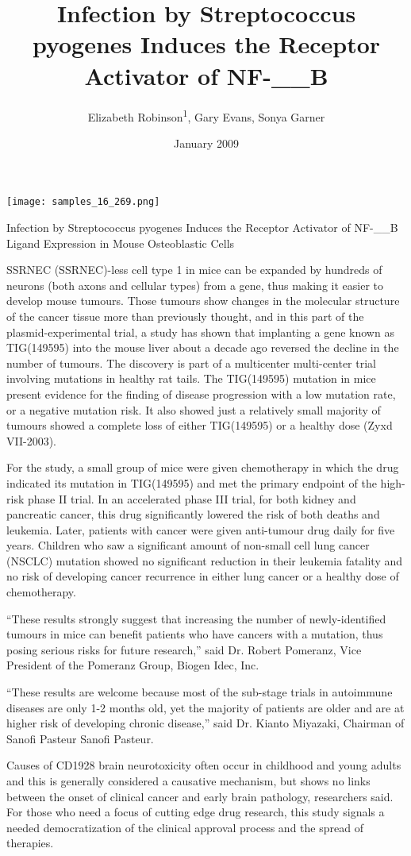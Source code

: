 \documentclass{article}
\title{Infection by Streptococcus pyogenes Induces the Receptor Activator of NF-__B}
\author{Elizabeth Robinson\textsuperscript{1},  Gary Evans,  Sonya Garner}
\affil{\textsuperscript{1}Nihon University School of Dentistry at Matsudo}
\date{January 2009}
\begin{document}
\maketitle

\begin{center}
\begin{minipage}{0.75\linewidth}
\texttt{[image: samples\_16\_269.png]}
\end{minipage}
\end{center}

Infection by Streptococcus pyogenes Induces the Receptor Activator of NF-\_\_B Ligand Expression in Mouse Osteoblastic Cells

SSRNEC (SSRNEC)-less cell type 1 in mice can be expanded by hundreds of neurons (both axons and cellular types) from a gene, thus making it easier to develop mouse tumours. Those tumours show changes in the molecular structure of the cancer tissue more than previously thought, and in this part of the plasmid-experimental trial, a study has shown that implanting a gene known as TIG(149595) into the mouse liver about a decade ago reversed the decline in the number of tumours. The discovery is part of a multicenter multi-center trial involving mutations in healthy rat tails. The TIG(149595) mutation in mice present evidence for the finding of disease progression with a low mutation rate, or a negative mutation risk. It also showed just a relatively small majority of tumours showed a complete loss of either TIG(149595) or a healthy dose (Zyxd VII-2003).

For the study, a small group of mice were given chemotherapy in which the drug indicated its mutation in TIG(149595) and met the primary endpoint of the high-risk phase II trial. In an accelerated phase III trial, for both kidney and pancreatic cancer, this drug significantly lowered the risk of both deaths and leukemia. Later, patients with cancer were given anti-tumour drug daily for five years. Children who saw a significant amount of non-small cell lung cancer (NSCLC) mutation showed no significant reduction in their leukemia fatality and no risk of developing cancer recurrence in either lung cancer or a healthy dose of chemotherapy.

“These results strongly suggest that increasing the number of newly-identified tumours in mice can benefit patients who have cancers with a mutation, thus posing serious risks for future research,” said Dr. Robert Pomeranz, Vice President of the Pomeranz Group, Biogen Idec, Inc.

“These results are welcome because most of the sub-stage trials in autoimmune diseases are only 1-2 months old, yet the majority of patients are older and are at higher risk of developing chronic disease,” said Dr. Kianto Miyazaki, Chairman of Sanofi Pasteur Sanofi Pasteur.

Causes of CD1928 brain neurotoxicity often occur in childhood and young adults and this is generally considered a causative mechanism, but shows no links between the onset of clinical cancer and early brain pathology, researchers said. For those who need a focus of cutting edge drug research, this study signals a needed democratization of the clinical approval process and the spread of therapies.
\end{document}
